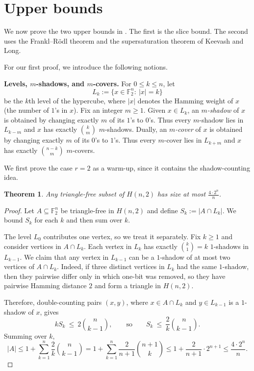 \documentclass[11pt]{article}
\theoremstyle{plain}
\newtheorem{theorem}{Theorem}
\newcommand{\F}{\mathbb{F}}
\begin{document}
\section{Upper bounds}\label{sec:upper}
We now prove the two upper bounds in .
The first is the slice bound.
The second uses the Frankl--R\"odl theorem and the supersaturation theorem of Keevash and Long.

For our first proof, we introduce the following notions.

\medskip
\noindent\textbf{Levels, $m$-shadows, and $m$-covers.}
For $0\le k\le n$, let
\[
L_k:=\{x\in\F_2^n:\ |x|=k\}
\]
be the $k$th level of the hypercube, where $|x|$ denotes the Hamming weight of $x$ (the number of $1$'s in $x$).
Fix an integer $m\ge 1$.
Given $x\in L_k$, an \emph{$m$-shadow} of $x$ is obtained by changing exactly $m$ of its $1$'s to $0$'s.
Thus every $m$-shadow lies in $L_{k-m}$ and $x$ has exactly $\binom{k}{m}$ $m$-shadows.
Dually, an \emph{$m$-cover} of $x$ is obtained by changing exactly $m$ of its $0$'s to $1$'s.
Thus every $m$-cover lies in $L_{k+m}$ and $x$ has exactly $\binom{n-k}{m}$ $m$-covers.

We first prove the case $r=2$ as a warm-up, since it contains the shadow-counting idea.
\begin{theorem}\label{thm:upper-r2}
Any triangle-free subset of $H(n,2)$ has size at most $\frac{4\cdot 2^n}{n}$.
\end{theorem}

\begin{proof}
Let $A\subseteq \F_2^n$ be triangle-free in $H(n,2)$ and define $S_k:=|A\cap L_k|$.
We bound $S_k$ for each $k$ and then sum over $k$.

The level $L_0$ contributes one vertex, so we treat it separately.
Fix $k\ge 1$ and consider vertices in $A\cap L_k$.
Each vertex in $L_k$ has exactly $\binom{k}{1}=k$  $1$-shadows in $L_{k-1}$.
We claim that any vertex in $L_{k-1}$ can be a $1$-shadow of at most two vertices of $A\cap L_k$.
Indeed, if three distinct vertices in $L_k$ had the same $1$-shadow, then they pairwise differ only in
which one-bit was removed, so they have pairwise Hamming distance $2$ and form a triangle in $H(n,2)$.

Therefore, double-counting pairs $(x,y)$, where $x\in A\cap L_k$
and $y\in L_{k-1}$ is a $1$-shadow of $x$, gives
\[
kS_k \ \le\ 2\binom{n}{k-1},
\qquad\text{so}\qquad
S_k \ \le\ \frac{2}{k}\binom{n}{k-1}.
\]
Summing over $k$,
\[
|A|
\le 1+\sum_{k=1}^n \frac{2}{k}\binom{n}{k-1}
=1+\sum_{k=1}^n \frac{2}{n+1}\binom{n+1}{k}
\le 1+\frac{2}{n+1}\cdot 2^{n+1}
\le \frac{4\cdot 2^n}{n}.
\]
\end{proof}
\end{document}
